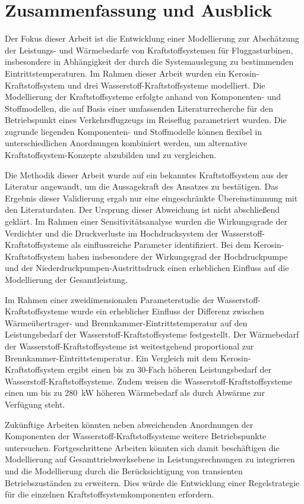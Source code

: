 \chapter{Zusammenfassung und Ausblick}
\label{chap:fazit}

Der Fokus dieser Arbeit ist die Entwicklung einer Modellierung zur Abschätzung der Leistungs- und Wärmebedarfe von Kraftstoffsystemen für Fluggasturbinen, insbesondere in Abhängigkeit der durch die Systemauslegung zu bestimmenden Eintrittstemperaturen. Im Rahmen dieser Arbeit wurden ein Kerosin-Kraftstoffsystem und drei Wasserstoff-Kraftstoffsysteme modelliert. Die Modellierung der Kraftstoffsysteme erfolgte anhand von Komponenten- und Stoffmodellen, die auf Basis einer umfassenden Literaturrecherche für den Betriebspunkt eines Verkehrsflugzeugs im Reiseflug parametriert wurden. Die zugrunde liegenden Komponenten- und Stoffmodelle können flexibel in unterschiedlichen Anordnungen kombiniert werden, um alternative Kraftstoffsystem-Konzepte abzubilden und zu vergleichen.

Die Methodik dieser Arbeit wurde auf ein bekanntes Kraftstoffsystem aus der Literatur angewandt, um die Aussagekraft des Ansatzes zu bestätigen. Das Ergebnis dieser Validierung ergab nur eine eingeschränkte Übereinstimmung mit den Literaturdaten. Der Ursprung dieser Abweichung ist nicht abschließend geklärt. Im Rahmen einer Sensitivitätsanalyse wurden die Wirkungsgrade der Verdichter und die Druckverluste im Hochdrucksystem der Wasserstoff-Kraftstoffsysteme als einflussreiche Parameter identifiziert. Bei dem Kerosin-Kraftstoffsystem haben insbesondere der Wirkungsgrad der Hochdruckpumpe und der Niederdruckpumpen-Austrittsdruck einen erheblichen Einfluss auf die Modellierung der Gesamtleistung. 

Im Rahmen einer zweidimensionalen Parameterstudie der Wasserstoff-Kraftstoffsysteme wurde ein erheblicher Einfluss der Differenz zwischen Wärmeübertrager- und Brennkammer-Eintrittstemperatur auf den Leistungsbedarf der Wasserstoff-Kraftstoffsysteme festgestellt. Der Wärmebedarf der Wasserstoff-Kraftstoffsysteme ist weitestgehend proportional zur Brennkammer-Eintrittstemperatur. Ein Vergleich mit dem Kerosin-Kraftstoffsystem ergibt einen bis zu 30-Fach höheren Leistungsbedarf der Wasserstoff-Kraftstoffsysteme. Zudem weisen die Wasserstoff-Kraftstoffsysteme einen um bis zu \SI{280}{\kilo\W} höheren Wärmebedarf als durch Abwärme zur Verfügung steht.

Zukünftige Arbeiten könnten neben abweichenden Anordnungen der Komponenten der Wasserstoff-Kraftstoffsysteme weitere Betriebspunkte untersuchen. Fortgeschrittene Arbeiten könnten sich damit beschäftigen die Modellierung auf Gesamttriebwerksebene in Leistungsrechnungen zu integrieren und die Modellierung durch die Berücksichtigung von transienten Betriebszuständen zu erweitern. Dies würde die Entwicklung einer Regelstrategie für die einzelnen Kraftstoffsystemkomponenten erfordern.